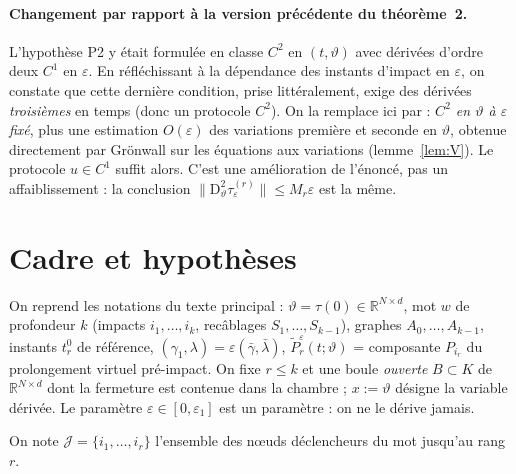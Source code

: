 \documentclass[11pt,a4paper]{article}
\theoremstyle{remark}
\theoremstyle{definition}
\newcommand{\R}{\mathbb R}
\newcommand{\norm}[1]{\lVert #1\rVert}
\newcommand{\eps}{\varepsilon}
\newcommand{\vth}{\vartheta}
\newcommand{\Pt}{\widetilde P}
\newcommand{\D}{\mathrm D}
\begin{document}
\paragraph{Changement par rapport à la version précédente du théorème~2.} L'hypothèse P2 y était formulée en classe $C^2$ en $(t,\vth)$ avec dérivées d'ordre deux $C^1$ en $\eps$. En réfléchissant à la dépendance des instants d'impact en $\eps$, on constate que cette dernière condition, prise littéralement, exige des dérivées \emph{troisièmes} en temps (donc un protocole $C^2$). On la remplace ici par : \emph{$C^2$ en $\vth$ à $\eps$ fixé}, plus une estimation $O(\eps)$ des variations première et seconde en $\vth$, obtenue directement par Grönwall sur les équations aux variations (lemme~\ref{lem:V}). Le protocole $u\in C^1$ suffit alors. C'est une amélioration de l'énoncé, pas un affaiblissement : la conclusion $\norm{\D^2_\vth\tau^{(r)}_\eps}\le M_r\eps$ est la même.

\section{Cadre et hypothèses}

On reprend les notations du texte principal : $\vth=\tau(0)\in\R^{N\times d}$, mot $w$ de profondeur $k$ (impacts $i_1,\dots,i_k$, recâblages $S_1,\dots,S_{k-1}$), graphes $A_0,\dots,A_{k-1}$, instants $t_r^0$ de référence, $(\gamma_1,\lambda)=\eps(\bar\gamma,\bar\lambda)$, $\Pt_r^\eps(t;\vth)$ = composante $P_{i_r}$ du prolongement virtuel pré-impact. On fixe $r\le k$ et une boule \emph{ouverte} $B\subset K$ de $\R^{N\times d}$ dont la fermeture est contenue dans la chambre ; $x:=\vth$ désigne la variable dérivée. Le paramètre $\eps\in[0,\eps_1]$ est un paramètre : on ne le dérive jamais.

On note $\mathcal J=\{i_1,\dots,i_r\}$ l'ensemble des n\oe uds déclencheurs du mot jusqu'au rang $r$.
\end{document}
